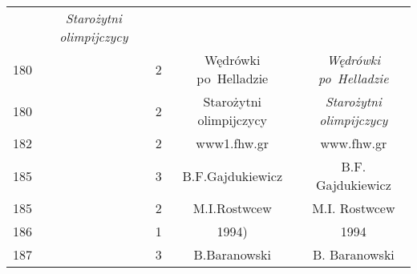 \documentclass[a4paper,11pt]{article}
\numberwithin{equation}{section}
\begin{document}
\begin{center}
\begin{tabular}{|c|c|c|c|c|}
    & \textit{Starożytni olimpijczycy} \\
    180 & & \hphantom{0}2 & Wędrówki po~Helladzie
    & \textit{Wędrówki po~Helladzie} \\
    180 & & \hphantom{0}2 & Starożytni olimpijczycy
    & \textit{Starożytni olimpijczycy} \\
    182 & & \hphantom{0}2 & www1.fhw.gr & www.fhw.gr \\
    185 & & \hphantom{0}3 & B.F.Gajdukiewicz & B.F. Gajdukiewicz \\
    185 & & \hphantom{0}2 & M.I.Rostwcew & M.I. Rostwcew \\
    186 & & \hphantom{0}1 & 1994) & 1994 \\
    187 & & \hphantom{0}3 & B.Baranowski & B. Baranowski \\
    \hline
  \end{tabular}





  \newpage


\end{center}
\end{document}
